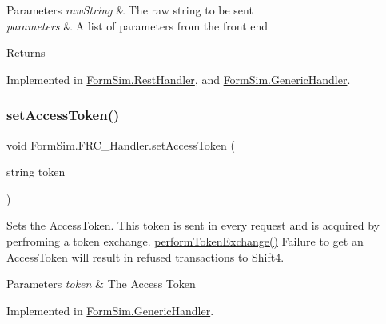 \begin{DoxyParams}{Parameters}
{\em raw\+String} & The raw string to be sent\\
\hline
{\em parameters} & A list of parameters from the front end\\
\hline
\end{DoxyParams}
\begin{DoxyReturn}{Returns}

\end{DoxyReturn}


Implemented in \mbox{\hyperlink{class_form_sim_1_1_rest_handler_a4a777189e9e16dc9970fe8f2557555db}{Form\+Sim.\+Rest\+Handler}}, and \mbox{\hyperlink{class_form_sim_1_1_generic_handler_a9e6731b583644ba3bd5bde94ef86c678}{Form\+Sim.\+Generic\+Handler}}.

\mbox{\label{interface_form_sim_1_1_f_r_c___handler_a6a11b11aaf8b033b87de9fddaf2d325e}} 
\subsubsection{\texorpdfstring{set\+Access\+Token()}{setAccessToken()}}
{\footnotesize\ttfamily void Form\+Sim.\+F\+R\+C\+\_\+\+Handler.\+set\+Access\+Token (\begin{DoxyParamCaption}\item[{string}]{token }\end{DoxyParamCaption})}



Sets the Access\+Token. This token is sent in every request and is acquired by perfroming a token exchange. \mbox{\hyperlink{interface_form_sim_1_1_f_r_c___handler_a32c299d3cb3cdd6c444e76b3671af1b4}{perform\+Token\+Exchange()}} Failure to get an Access\+Token will result in refused transactions to Shift4. 


\begin{DoxyParams}{Parameters}
{\em token} & The Access Token\\
\hline
\end{DoxyParams}


Implemented in \mbox{\hyperlink{class_form_sim_1_1_generic_handler_ac2fe26607f27b8009b3d744bee7ba794}{Form\+Sim.\+Generic\+Handler}}.

